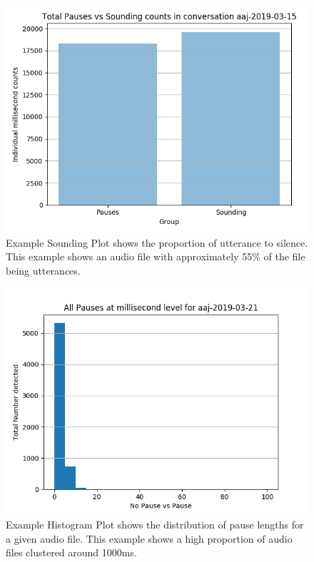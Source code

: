 \begin{figure}[h!]
	\center
	\includegraphics[scale=0.6]{src/main-matter/methodology/code-base/output/binary_pause_bar_chart}
	\caption{Example Sounding Plot shows the proportion of utterance to silence. This example shows an audio file with approximately 55\% of the file being utterances.}
	\label{fig:processing}
\end{figure}

\begin{figure}[h!]
	\center
	\includegraphics[scale=0.6]{src/main-matter/methodology/code-base/output/pause_histogram}
	\caption{Example Histogram Plot shows the distribution of pause lengths for a given audio file. This example shows a high proportion of audio files clustered around 1000ms.}
	\label{fig:processing}
\end{figure}

